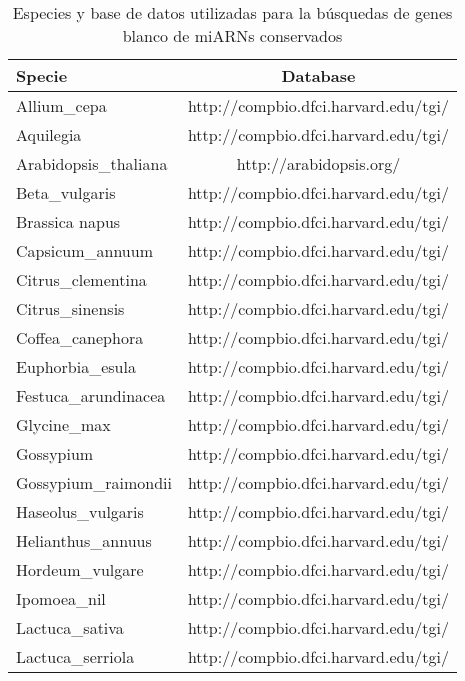 \begin{table}
\small
\centering
\caption{Especies y base de datos utilizadas para la búsquedas de genes blanco de miARNs conservados}
\label{table:NAR_table_S2}
\begin{tabular}{lc}
Specie                         & \multicolumn{1}{c}{Database}         \\
\hline 
Allium\_cepa                   & http://compbio.dfci.harvard.edu/tgi/ \\
Aquilegia                      & http://compbio.dfci.harvard.edu/tgi/ \\
Arabidopsis\_thaliana          & http://arabidopsis.org/              \\
Beta\_vulgaris                 & http://compbio.dfci.harvard.edu/tgi/ \\
Brassica napus                 & http://compbio.dfci.harvard.edu/tgi/ \\
Capsicum\_annuum               & http://compbio.dfci.harvard.edu/tgi/ \\
Citrus\_clementina             & http://compbio.dfci.harvard.edu/tgi/ \\
Citrus\_sinensis               & http://compbio.dfci.harvard.edu/tgi/ \\
Coffea\_canephora              & http://compbio.dfci.harvard.edu/tgi/ \\
Euphorbia\_esula               & http://compbio.dfci.harvard.edu/tgi/ \\
Festuca\_arundinacea           & http://compbio.dfci.harvard.edu/tgi/ \\
Glycine\_max                   & http://compbio.dfci.harvard.edu/tgi/ \\
Gossypium                      & http://compbio.dfci.harvard.edu/tgi/ \\
Gossypium\_raimondii           & http://compbio.dfci.harvard.edu/tgi/ \\
Haseolus\_vulgaris             & http://compbio.dfci.harvard.edu/tgi/ \\
Helianthus\_annuus             & http://compbio.dfci.harvard.edu/tgi/ \\
Hordeum\_vulgare               & http://compbio.dfci.harvard.edu/tgi/ \\
Ipomoea\_nil                   & http://compbio.dfci.harvard.edu/tgi/ \\
Lactuca\_sativa                & http://compbio.dfci.harvard.edu/tgi/ \\
Lactuca\_serriola              & http://compbio.dfci.harvard.edu/tgi/ \\

\end{tabular}
\end{table}
